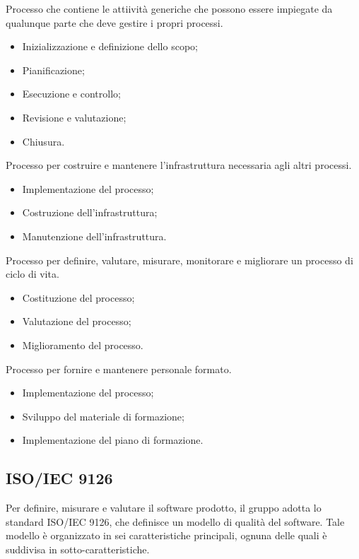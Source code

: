 Processo che contiene le attiività generiche che possono 
essere impiegate da qualunque parte che deve gestire i propri processi.
\begin{itemize}
    \item Inizializzazione e definizione dello scopo;
    \item Pianificazione;
    \item Esecuzione e controllo;
    \item Revisione e valutazione;
    \item Chiusura.
\end{itemize}

Processo per costruire e mantenere l'infrastruttura necessaria
agli altri processi.
\begin{itemize}
    \item Implementazione del processo;
    \item Costruzione dell'infrastruttura;
    \item Manutenzione dell'infrastruttura.
\end{itemize}

Processo per definire, valutare, misurare, monitorare e migliorare
un processo di ciclo di vita.
\begin{itemize}
    \item Costituzione del processo;
    \item Valutazione del processo;
    \item Miglioramento del processo.
\end{itemize}

Processo per fornire e mantenere personale formato.
\begin{itemize}
    \item Implementazione del processo;
    \item Sviluppo del materiale di formazione;
    \item Implementazione del piano di formazione.
\end{itemize}

\subsection{ISO/IEC 9126}
Per definire, misurare e valutare il software prodotto, il gruppo adotta lo 
standard ISO/IEC 9126, che definisce un modello di qualità del software. Tale 
modello è organizzato in sei caratteristiche principali, 
ognuna delle quali è suddivisa in sotto-caratteristiche.

